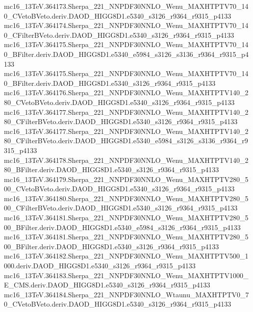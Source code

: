 \begin{footnotesize}
mc16\_13TeV.364173.Sherpa\_221\_NNPDF30NNLO\_Wenu\_MAXHTPTV70\_140\_CVetoBVeto.deriv.DAOD\_HIGG8D1.e5340\_s3126\_r9364\_r9315\_p4133 \\
mc16\_13TeV.364174.Sherpa\_221\_NNPDF30NNLO\_Wenu\_MAXHTPTV70\_140\_CFilterBVeto.deriv.DAOD\_HIGG8D1.e5340\_s3126\_r9364\_r9315\_p4133 \\
mc16\_13TeV.364175.Sherpa\_221\_NNPDF30NNLO\_Wenu\_MAXHTPTV70\_140\_BFilter.deriv.DAOD\_HIGG8D1.e5340\_e5984\_s3126\_s3136\_r9364\_r9315\_p4133 \\
mc16\_13TeV.364175.Sherpa\_221\_NNPDF30NNLO\_Wenu\_MAXHTPTV70\_140\_BFilter.deriv.DAOD\_HIGG8D1.e5340\_s3126\_r9364\_r9315\_p4133 \\
mc16\_13TeV.364176.Sherpa\_221\_NNPDF30NNLO\_Wenu\_MAXHTPTV140\_280\_CVetoBVeto.deriv.DAOD\_HIGG8D1.e5340\_s3126\_r9364\_r9315\_p4133 \\
mc16\_13TeV.364177.Sherpa\_221\_NNPDF30NNLO\_Wenu\_MAXHTPTV140\_280\_CFilterBVeto.deriv.DAOD\_HIGG8D1.e5340\_s3126\_r9364\_r9315\_p4133 \\
mc16\_13TeV.364177.Sherpa\_221\_NNPDF30NNLO\_Wenu\_MAXHTPTV140\_280\_CFilterBVeto.deriv.DAOD\_HIGG8D1.e5340\_e5984\_s3126\_s3136\_r9364\_r9315\_p4133 \\
mc16\_13TeV.364178.Sherpa\_221\_NNPDF30NNLO\_Wenu\_MAXHTPTV140\_280\_BFilter.deriv.DAOD\_HIGG8D1.e5340\_s3126\_r9364\_r9315\_p4133 \\
mc16\_13TeV.364179.Sherpa\_221\_NNPDF30NNLO\_Wenu\_MAXHTPTV280\_500\_CVetoBVeto.deriv.DAOD\_HIGG8D1.e5340\_s3126\_r9364\_r9315\_p4133 \\
mc16\_13TeV.364180.Sherpa\_221\_NNPDF30NNLO\_Wenu\_MAXHTPTV280\_500\_CFilterBVeto.deriv.DAOD\_HIGG8D1.e5340\_s3126\_r9364\_r9315\_p4133 \\
mc16\_13TeV.364181.Sherpa\_221\_NNPDF30NNLO\_Wenu\_MAXHTPTV280\_500\_BFilter.deriv.DAOD\_HIGG8D1.e5340\_e5984\_s3126\_r9364\_r9315\_p4133 \\
mc16\_13TeV.364181.Sherpa\_221\_NNPDF30NNLO\_Wenu\_MAXHTPTV280\_500\_BFilter.deriv.DAOD\_HIGG8D1.e5340\_s3126\_r9364\_r9315\_p4133 \\
mc16\_13TeV.364182.Sherpa\_221\_NNPDF30NNLO\_Wenu\_MAXHTPTV500\_1000.deriv.DAOD\_HIGG8D1.e5340\_s3126\_r9364\_r9315\_p4133 \\
mc16\_13TeV.364183.Sherpa\_221\_NNPDF30NNLO\_Wenu\_MAXHTPTV1000\_E\_CMS.deriv.DAOD\_HIGG8D1.e5340\_s3126\_r9364\_r9315\_p4133 \\
mc16\_13TeV.364184.Sherpa\_221\_NNPDF30NNLO\_Wtaunu\_MAXHTPTV0\_70\_CVetoBVeto.deriv.DAOD\_HIGG8D1.e5340\_s3126\_r9364\_r9315\_p4133 \\

\end{footnotesize}
